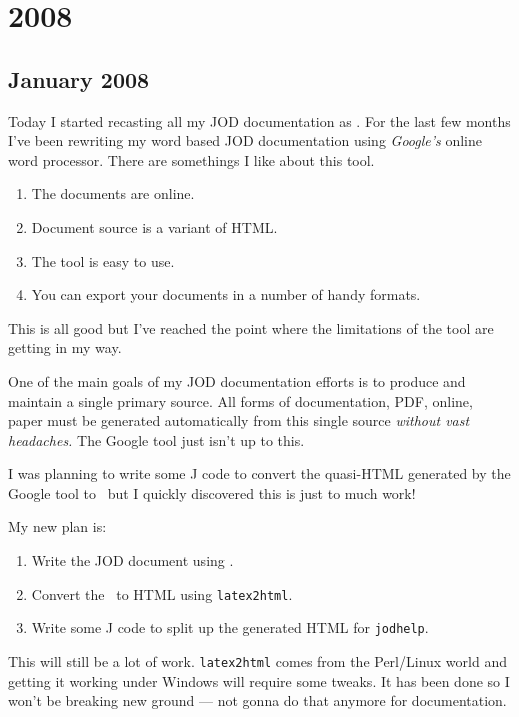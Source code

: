 
\section{2008}

\subsection{January 2008}

\vspace{.15in}

Today I started recasting all my JOD documentation as \LaTeXe.  For the
last few months I've been  rewriting my word based
JOD documentation using \emph{Google's} online word processor.  There
are somethings I like about this tool.  
\begin{enumerate}
	\item The documents are online.
	\item Document source is a variant of HTML.
	\item The tool is easy to use.
	\item You can export your documents in a number of handy formats.
\end{enumerate}
This is all good but I've reached the point where the limitations
of the tool are getting in my way.  

One of the main goals of my JOD documentation efforts is to produce
and maintain a single primary source.  All forms of documentation,
PDF, online, paper must be generated automatically from this
single source \emph{without vast headaches.}  The Google tool just isn't
up to this. 

I was planning to write some J code to convert the quasi-HTML generated
by the Google tool to \LaTeXe\ but I quickly discovered this is just to much work!

My new plan is:
\begin{enumerate}
	\item Write the JOD document using \LaTeXe.
	\item Convert the \LaTeXe\  to HTML using \verb?latex2html?.
	\item Write some J code to split up the generated HTML for \texttt{jodhelp}.
\end{enumerate}
This will still be a lot of work.  \verb?latex2html? comes from the Perl/Linux world
and getting it working under Windows will require some tweaks.  It has been
done so I won't be breaking new ground --- not gonna do that anymore for documentation.

